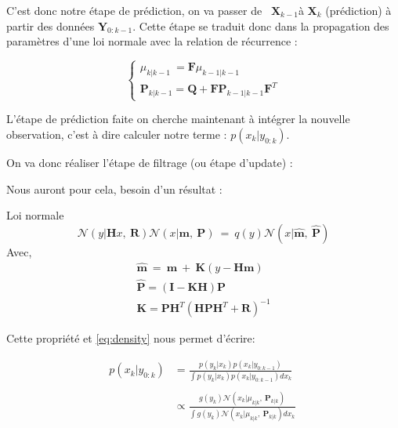 C'est donc notre étape de prédiction, on va passer de \ $\displaystyle \mathbf{X}_{k-1}$à $\displaystyle \mathbf{X}_{k}$ (prédiction) à partir des données $\displaystyle \mathbf{Y}_{0:k-1}$. Cette étape se traduit donc dans la propagation des paramètres d'une loi normale avec la relation de récurrence :

\begin{equation}
	\begin{cases}
		\mu _{k|k-1} \ =\mathbf{F} \mu _{k-1|k-1} \ \\
		\mathbf{P}_{k|k-1} =\mathbf{Q} +\mathbf{FP}_{k-1|k-1}\mathbf{F}^{T}
	\end{cases}
\end{equation}


L'étape de prédiction faite on cherche maintenant à intégrer la nouvelle observation, c'est à dire calculer notre terme : $\displaystyle p( x_{k} |y_{0:k})$.


\newpage


On va donc réaliser l'étape de filtrage (ou étape d'update) :

Nous auront pour cela, besoin d'un résultat :

\begin{Theorem}{}{Loi normale}
	\begin{equation*}
		\mathcal{N}( y|\mathbf{H} x,\ \mathbf{R})\mathcal{N}( x|\mathbf{m} ,\ \mathbf{P}) \ =\ q( y)\mathcal{N}( x|\hat{\mathbf{m}} ,\ \hat{\mathbf{P}})
	\end{equation*}
Avec,
	\begin{gather*}
		\hat{\mathbf{m}} \ =\ \mathbf{m} \ +\ \mathbf{K}( y-\mathbf{Hm})\\
		\hat{\mathbf{P}} =(\mathbf{I} -\mathbf{KH})\mathbf{P}\\
		\mathbf{K} =\mathbf{PH}^{T}\left(\mathbf{HPH}^{T} +\mathbf{R}\right)^{-1}
	\end{gather*}
\end{Theorem}

Cette propriété et  \ref{eq:density} nous permet d'écrire:

\begin{equation}
	\begin{aligned}
		p( x_{k} |y_{0:k}) & =\frac{p( y_{k} |x_{k}) p( x_{k} |y_{0:k-1})}{\int p( y_{k} |x_{k}) p( x_{k} |y_{0:k-1}) dx_{k}}\\
		& \\
		& \propto \frac{g( y_{k})\mathcal{N}( x_{k} |\mu _{k|k} ,\ \mathbf{P}_{k|k})}{\int g( y_{k})\mathcal{N}( x_{k} |\mu _{k|k} ,\ \mathbf{P}_{k|k}) dx_{k}}
	\end{aligned} \ 
\end{equation}


